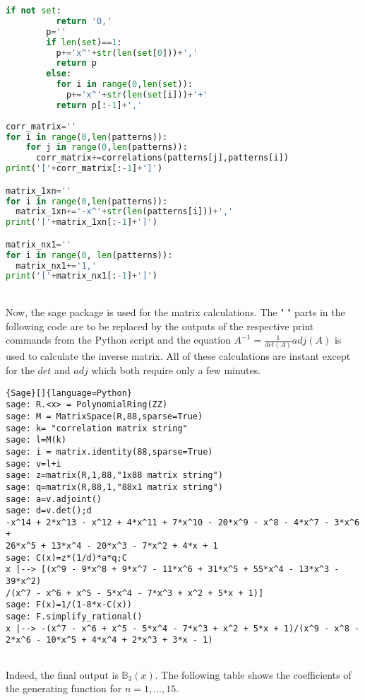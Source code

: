 \documentclass[12pt]{report}
\begin{document}
{{{\begin{lstlisting}[language=Python]
        if not set:
          return '0,'
        p=''
        if len(set)==1:
          p+='x^'+str(len(set[0]))+','
          return p
        else:
          for i in range(0,len(set)):
            p+='x^'+str(len(set[i]))+'+'
          return p[:-1]+','
                  
corr_matrix=''
for i in range(0,len(patterns)):
    for j in range(0,len(patterns)):
      corr_matrix+=correlations(patterns[j],patterns[i])
print('['+corr_matrix[:-1]+']')

matrix_1xn=''
for i in range(0,len(patterns)):
  matrix_1xn+='-x^'+str(len(patterns[i]))+','
print('['+matrix_1xn[:-1]+']')

matrix_nx1=''
for i in range(0, len(patterns)):
  matrix_nx1+='1,'
print('['+matrix_nx1[:-1]+']')
\end{lstlisting} } \quad \\

\noindent Now, the sage package is used for the matrix calculations. The " " parts in the following code are to be replaced by the outputs of the respective print commands from the Python script and the equation $A^{-1}=\frac{1}{det(A)}adj(A)$ is used to calculate the inverse matrix. All of these calculations are instant except for the $det$ and $adj$ which both require only a few minutes. \\

{
\begin{lstlisting}{Sage}[]{language=Python}
sage: R.<x> = PolynomialRing(ZZ)
sage: M = MatrixSpace(R,88,sparse=True)
sage: k= "correlation matrix string"
sage: l=M(k)
sage: i = matrix.identity(88,sparse=True)         
sage: v=l+i
sage: z=matrix(R,1,88,"1x88 matrix string")
sage: q=matrix(R,88,1,"88x1 matrix string")
sage: a=v.adjoint()
sage: d=v.det();d
-x^14 + 2*x^13 - x^12 + 4*x^11 + 7*x^10 - 20*x^9 - x^8 - 4*x^7 - 3*x^6 + 
26*x^5 + 13*x^4 - 20*x^3 - 7*x^2 + 4*x + 1
sage: C(x)=z*(1/d)*a*q;C
x |--> [(x^9 - 9*x^8 + 9*x^7 - 11*x^6 + 31*x^5 + 55*x^4 - 13*x^3 - 39*x^2)
/(x^7 - x^6 + x^5 - 5*x^4 - 7*x^3 + x^2 + 5*x + 1)]
sage: F(x)=1/(1-8*x-C(x))
sage: F.simplify_rational()
x |--> -(x^7 - x^6 + x^5 - 5*x^4 - 7*x^3 + x^2 + 5*x + 1)/(x^9 - x^8 - 2*x^6 - 10*x^5 + 4*x^4 + 2*x^3 + 3*x - 1)


\end{lstlisting}
}

\noindent Indeed, the final output is $\mathbb{B}_3(x)$. The following table shows the coefficients of the generating function for $n=1,\ldots,15$.

}}
\end{document}
